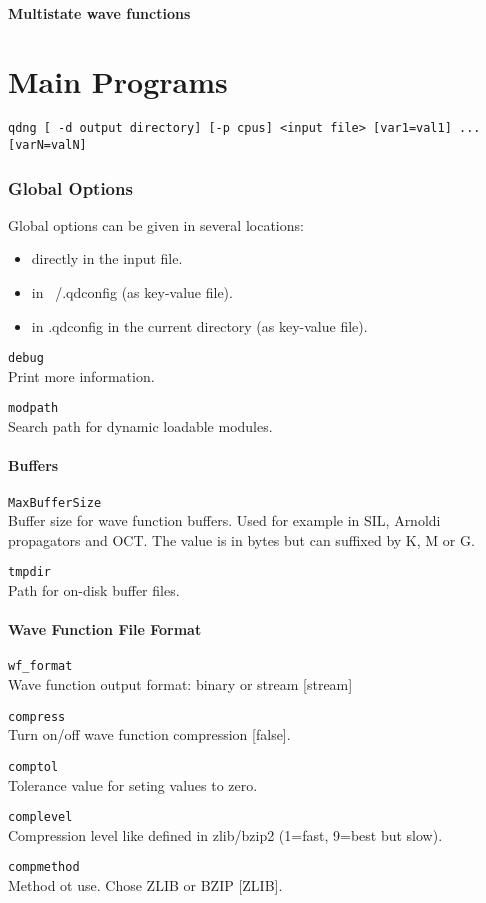 \documentclass[a4paper,12pt]{scrbook}
\newcommand{\option}[2]{\item \texttt{#1}\\ #2}
\begin{document}
\subsubsection{Multistate wave functions}

\chapter{Main Programs}

\begin{verbatim}
qdng [ -d output directory] [-p cpus] <input file> [var1=val1] ... [varN=valN]
\end{verbatim}

\subsection{Global Options}
Global options can be given in several locations:
\begin{itemize}
 \item directly in the input file.
 \item in ~/.qdconfig (as key-value file).
 \item in .qdconfig in the current directory (as key-value file).
\end{itemize}

\begin{options}
 \option{debug}{Print more information.}
 \option{modpath}{Search path for dynamic loadable modules.}
\end{options}

\subsubsection{Buffers}
\begin{options}
 \option{MaxBufferSize}{Buffer size for wave function buffers. Used for example in SIL, Arnoldi propagators and OCT. The value is in bytes but
 can suffixed by K, M or G.}
 \option{tmpdir}{Path for on-disk buffer files.}
\end{options}

\subsubsection{Wave Function File Format}
\begin{options}
 \option{wf\_format}{Wave function output format: binary or stream  [stream]}
 \option{compress}{Turn on/off wave function compression [false].}
 \option{comptol}{Tolerance value for seting values to zero.}
 \option{complevel}{Compression level like defined in zlib/bzip2 (1=fast, 9=best but slow).}
 \option{compmethod}{Method ot use. Chose ZLIB or BZIP [ZLIB].}
\end{options}
\end{document}
